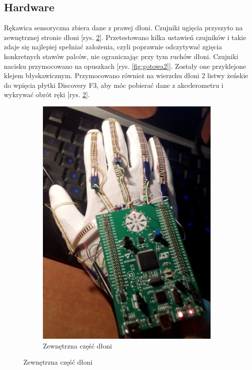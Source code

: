 \documentclass[12pt,a4paper]{article}
\begin{document}
\subsection{Hardware}
Rękawica sensoryczna zbiera dane z prawej dłoni. Czujniki ugięcia przyszyto na zewnętrznej stronie dłoni [rys. \ref{fig:gotowa}].
 Przetestowano kilka ustawień czujników i takie zdaje się najlepiej spełniać założenia, czyli poprawnie odczytywać zgięcia konkretnych stawów palców, nie ograniczając przy tym ruchów dłoni. Czujniki nacisku przymocowano na opuszkach [rys. \ref{fig:gotowa2}]. Zostały one przyklejone klejem błyskawicznym. Przymocowano również na wierzchu dłoni 2 listwy żeńskie do wpięcia płytki Discovery F3, aby móc pobierać dane z akcelerometru i wykrywać obrót ręki [rys. \ref{fig:gotowa}].
 
\begin{figure}[!htb]
\centering
\begin{subfigure}{.5\textwidth}
	\centering
	\includegraphics[width=.9\textwidth]{images/gotowa.jpg}
	\caption{Zewnętrzna część dłoni}
	\label{fig:gotowa}
\end{subfigure}%

\end{figure}
\end{document}
